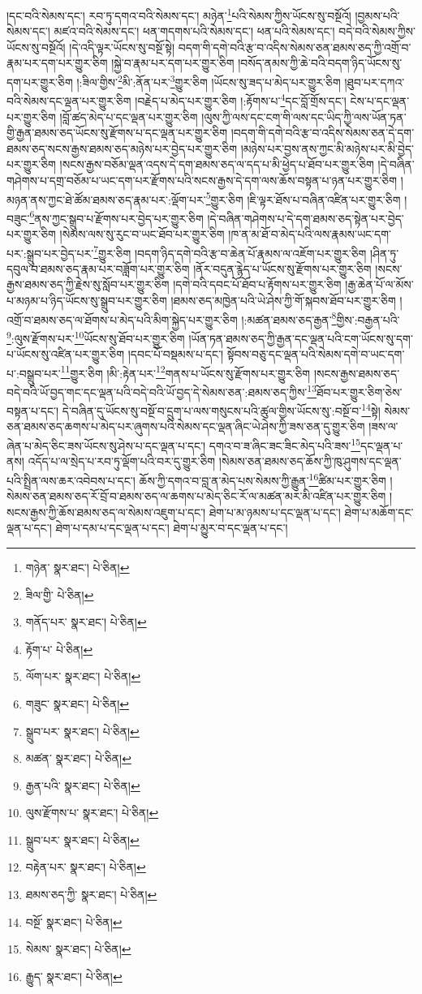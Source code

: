 །དང་བའི་སེམས་དང་། རབ་ཏུ་དགའ་བའི་སེམས་དང་། མཉེན་\footnote{གཉེན་  སྣར་ཐང་།  པེ་ཅིན། }པའི་སེམས་ཀྱིས་ཡོངས་སུ་བསྔོའོ། །བྱམས་པའི་སེམས་དང་། མཛའ་བའི་སེམས་དང་། ཕན་གདགས་པའི་སེམས་དང་། ཕན་པའི་སེམས་དང་། བདེ་བའི་སེམས་ཀྱིས་ཡོངས་སུ་བསྔོའོ། །དེ་འདི་ལྟར་ཡོངས་སུ་བསྔོ་སྟེ། བདག་གི་དགེ་བའི་རྩ་བ་འདིས་སེམས་ཅན་ཐམས་ཅད་ཀྱི་འགྲོ་བ་རྣམ་པར་དག་པར་གྱུར་ཅིག །སྐྱེ་བ་རྣམ་པར་དག་པར་གྱུར་ཅིག །བསོད་ནམས་ཀྱི་ཆེ་བའི་བདག་ཉིད་ཡོངས་སུ་དག་པར་གྱུར་ཅིག །:ཟིལ་གྱིས་\footnote{ཟིལ་གྱི་  པེ་ཅིན། }མི་:ནོན་པར་\footnote{གནོད་པར་  སྣར་ཐང་།  པེ་ཅིན། }གྱུར་ཅིག །ཡོངས་སུ་ཟད་པ་མེད་པར་གྱུར་ཅིག །ཐུབ་པར་དཀའ་བའི་སེམས་དང་ལྡན་པར་གྱུར་ཅིག །བརྗེད་པ་མེད་པར་གྱུར་ཅིག །:རྟོགས་པ་\footnote{རྟོག་པ་  པེ་ཅིན། }དང་བློ་གྲོས་དང་། ངེས་པ་དང་ལྡན་པར་གྱུར་ཅིག །བློ་ཚད་མེད་པ་དང་ལྡན་པར་གྱུར་ཅིག །ལུས་ཀྱི་ལས་དང་ངག་གི་ལས་དང་ཡིད་ཀྱི་ལས་ཡོན་ཏན་གྱི་རྒྱན་ཐམས་ཅད་ཡོངས་སུ་རྫོགས་པ་དང་ལྡན་པར་གྱུར་ཅིག །བདག་གི་དགེ་བའི་རྩ་བ་འདིས་སེམས་ཅན་དེ་དག་ཐམས་ཅད་སངས་རྒྱས་ཐམས་ཅད་མཉེས་པར་བྱེད་པར་གྱུར་ཅིག །མཉེས་པར་བྱས་ནས་ཀྱང་མི་མཉེས་པར་མི་བྱེད་པར་གྱུར་ཅིག །སངས་རྒྱས་བཅོམ་ལྡན་འདས་དེ་དག་ཐམས་ཅད་ལ་དད་པ་མི་ཕྱེད་པ་ཐོབ་པར་གྱུར་ཅིག །དེ་བཞིན་གཤེགས་པ་དགྲ་བཅོམ་པ་ཡང་དག་པར་རྫོགས་པའི་སངས་རྒྱས་དེ་དག་ལས་ཆོས་བསྟན་པ་ཉན་པར་གྱུར་ཅིག །མཉན་ནས་ཀྱང་ཐེ་ཚོམ་ཐམས་ཅད་རྣམ་པར་:ལྡོག་པར་\footnote{ལོག་པར་  སྣར་ཐང་།  པེ་ཅིན། }གྱུར་ཅིག །ཇི་ལྟར་ཐོས་པ་བཞིན་འཛིན་པར་གྱུར་ཅིག །བཟུང་\footnote{གཟུང་  སྣར་ཐང་།  པེ་ཅིན། }ནས་ཀྱང་སྒྲུབ་པ་རྫོགས་པར་བྱེད་པར་གྱུར་ཅིག །དེ་བཞིན་གཤེགས་པ་དེ་དག་ཐམས་ཅད་སྟེན་པར་བྱེད་པར་གྱུར་ཅིག །སེམས་ལས་སུ་རུང་བ་ཡང་ཐོབ་པར་གྱུར་ཅིག །ཁ་ན་མ་ཐོ་བ་མེད་པའི་ལས་རྣམས་ཡང་དག་པར་:སྒྲུབ་པར་བྱེད་པར་\footnote{སྒྲུབ་པར་  སྣར་ཐང་།  པེ་ཅིན། }གྱུར་ཅིག །བདག་ཉིད་དགེ་བའི་རྩ་བ་ཆེན་པོ་རྣམས་ལ་འཇོག་པར་གྱུར་ཅིག །ཤིན་ཏུ་དབུལ་བ་ཐམས་ཅད་རྣམ་པར་བཟློག་པར་གྱུར་ཅིག །ནོར་བདུན་རྙེད་པ་ཡོངས་སུ་རྫོགས་པར་གྱུར་ཅིག །སངས་རྒྱས་ཐམས་ཅད་ཀྱི་རྗེས་སུ་སློབ་པར་གྱུར་ཅིག །དགེ་བའི་དབང་པོ་ཐོབ་པ་རྟོགས་པར་གྱུར་ཅིག །རྒྱ་ཆེན་པོ་ལ་མོས་པ་མཉམ་པ་ཉིད་ཡོངས་སུ་སྒྲུབ་པར་གྱུར་ཅིག །ཐམས་ཅད་མཁྱེན་པའི་ཡེ་ཤེས་ཀྱི་གོ་སྐབས་ཐོབ་པར་གྱུར་ཅིག །འགྲོ་བ་ཐམས་ཅད་ལ་ཐོགས་པ་མེད་པའི་མིག་སྐྱེད་པར་གྱུར་ཅིག །:མཚན་ཐམས་ཅད་རྒྱན་\footnote{མཚན་  སྣར་ཐང་།  པེ་ཅིན། }གྱིས་:བརྒྱན་པའི་\footnote{རྒྱན་པའི་  སྣར་ཐང་།  པེ་ཅིན། }:ལུས་རྫོགས་པར་\footnote{ལུས་རྫོགས་པ་  སྣར་ཐང་།  པེ་ཅིན། }ཡོངས་སུ་ཐོབ་པར་གྱུར་ཅིག །ཡོན་ཏན་ཐམས་ཅད་ཀྱི་རྒྱན་དང་ལྡན་པའི་ངག་ཡོངས་སུ་དག་པ་ཡོངས་སུ་འཛིན་པར་གྱུར་ཅིག །དབང་པོ་བསྡམས་པ་དང་། སྟོབས་བཅུ་དང་ལྡན་པའི་སེམས་དགེ་བ་ཡང་དག་པ་:བསྒྲུབ་པར་\footnote{སྒྲུབ་པར་  སྣར་ཐང་།  པེ་ཅིན། }གྱུར་ཅིག །མི་:རྟེན་པར་\footnote{བརྟེན་པར་  སྣར་ཐང་།  པེ་ཅིན། }གནས་པ་ཡོངས་སུ་རྫོགས་པར་གྱུར་ཅིག །སངས་རྒྱས་ཐམས་ཅད་བདེ་བའི་ཡོ་བྱད་གང་དང་ལྡན་པའི་བདེ་བའི་ཡོ་བྱད་དེ་སེམས་ཅན་:ཐམས་ཅད་ཀྱིས་\footnote{ཐམས་ཅད་ཀྱི་  སྣར་ཐང་།  པེ་ཅིན། }ཐོབ་པར་གྱུར་ཅིག་ཅེས་བསྟན་པ་དང་། དེ་བཞིན་དུ་ཡོངས་སུ་བསྔོ་བ་དྲུག་པ་ལས་གསུངས་པའི་ཚུལ་གྱིས་ཡོངས་སུ་:བསྔོ་བ་\footnote{བསྔོ་  སྣར་ཐང་།  པེ་ཅིན། }སྟེ། སེམས་ཅན་ཐམས་ཅད་ཆགས་པ་མེད་པར་ཞུགས་པའི་སེམས་དང་ལྡན་ཞིང་ཡེ་ཤེས་ཀྱི་ཟས་ཅན་དུ་གྱུར་ཅིག །ཟས་ལ་ཞེན་པ་མེད་ཅིང་ཟས་ཡོངས་སུ་ཤེས་པ་དང་ལྡན་པ་དང་། དགའ་བ་ཟ་ཞིང་ཟང་ཟིང་མེད་པའི་ཟས་\footnote{སེམས་  སྣར་ཐང་།  པེ་ཅིན། }དང་ལྡན་པ་ནས། འདོད་པ་ལ་སྲེད་པ་རབ་ཏུ་ལྡོག་པའི་བར་དུ་གྱུར་ཅིག །སེམས་ཅན་ཐམས་ཅད་ཆོས་ཀྱི་ཁུ་ཤུགས་དང་ལྡན་པའི་སྤྲིན་ལས་ཆར་འབེབས་པ་དང་། ཆོས་ཀྱི་དགའ་བ་བླ་ན་མེད་པས་སེམས་ཀྱི་རྒྱུན་\footnote{རྒྱུད་  སྣར་ཐང་།  པེ་ཅིན། }ཚིམ་པར་གྱུར་ཅིག །སེམས་ཅན་ཐམས་ཅད་རོ་བྲོ་བ་ཐམས་ཅད་ལ་ཆགས་པ་མེད་ཅིང་རོ་ལ་མཚན་མར་མི་འཛིན་པར་གྱུར་ཅིག །སངས་རྒྱས་ཀྱི་ཆོས་ཐམས་ཅད་ལ་སེམས་འཇུག་པ་དང་། ཐེག་པ་མ་ཉམས་པ་དང་ལྡན་པ་དང་། ཐེག་པ་མཆོག་དང་ལྡན་པ་དང་། ཐེག་པ་དམ་པ་དང་ལྡན་པ་དང་། ཐེག་པ་མྱུར་བ་དང་ལྡན་པ་དང་། 